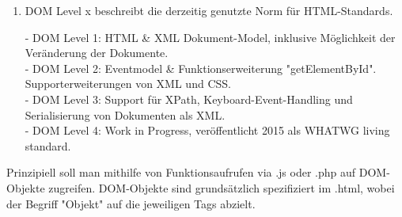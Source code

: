\documentclass[11pt]{article}
\begin{document}
\begin{enumerate}[\thesection .1]
\begin{enumerate}[$\diamond$]
            \item DOM Level x beschreibt die derzeitig genutzte Norm für HTML-Standards.
            \begin{addmargin}[1em]{1em}
                - DOM Level 1: HTML \& XML Dokument-Model, inklusive Möglichkeit der Veränderung der Dokumente.\\
                - DOM Level 2: Eventmodel \& Funktionserweiterung "getElementById". Supporterweiterungen von XML und CSS.\\
                - DOM Level 3: Support für XPath, Keyboard-Event-Handling und Serialisierung von Dokumenten als XML.\\
                - DOM Level 4: Work in Progress, veröffentlicht 2015 als WHATWG living standard.
            \end{addmargin}
        \end{enumerate}

        Prinzipiell soll man mithilfe von Funktionsaufrufen via .js oder .php auf DOM-Objekte zugreifen.
        DOM-Objekte sind grundsätzlich spezifiziert im .html, wobei der Begriff "Objekt" auf die jeweiligen Tags abzielt.


\end{enumerate}
\end{document}
